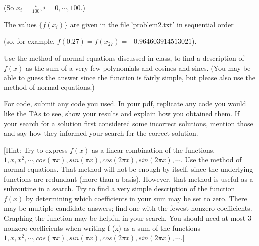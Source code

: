 \documentclass[conference,onecolumn]{IEEEtran}
\begin{document}
\begin{enumerate}[label=\arabic{enumi}.]
          (So $x_i = \frac{i}{100}, i = 0, \cdots , 100$.)

          The values $\{f (x_i)\}$ are given in the file 'problem2.txt' in sequential order

          (so, for example, $f (0.27) = f (x_{27}) = -0.964603914513021$).

          Use the method of normal equations discussed in class, to find a description of $f (x)$ as the sum of a very few polynomials and cosines and sines.
          (You may be able to guess the answer since the function is fairly simple, but please also use the method of normal equations.)

          For code, submit any code you used.
          In your pdf, replicate any code you would like the TAs to see, show your results and explain how you obtained them.
          If your search for a solution first considered some incorrect solutions, mention those and say how they informed your search for the correct solution.

              [Hint: Try to express $f (x)$ as a linear combination of the functions, $1, x, x^2, \cdots , cos(\pi x), sin(\pi x), cos(2\pi x), sin(2\pi x), \cdots$.
                  Use the method of normal equations.
                  That method will not be enough by itself, since the underlying functions are redundant (more than a basis).
                  However, that method is useful as a subroutine in a search.
                  Try to find a very simple description of the function $f (x)$ by determining which coefficients in your sum may be
                  set to zero.
                  There may be multiple candidate answers; find one with the fewest nonzero coefficients.
                  Graphing the function may be helpful in your search.
                  You should need at most 3 nonzero coefficients when writing f (x) as a sum of the functions $1, x, x^2, \cdots , cos(\pi x), sin(\pi x), cos(2\pi x), sin(2\pi x), \cdots$.]


\end{enumerate}
\end{document}

